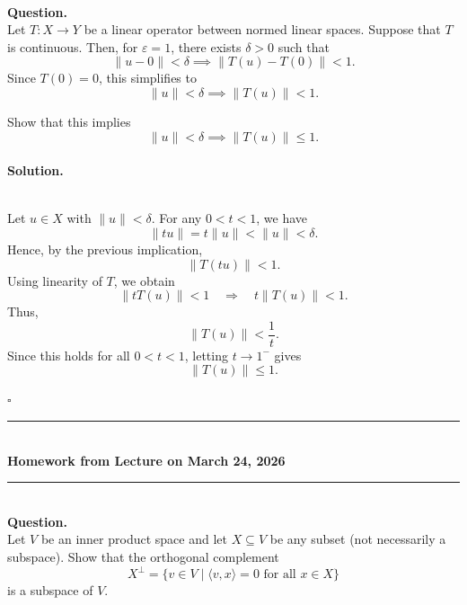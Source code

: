 \documentclass{article}
\begin{document}
\bigskip

\hfill \break  $~\!\!$ \dotfill \medskip \\
\textbf{Question.}\\
Let $T: X \to Y$ be a linear operator between normed linear spaces. Suppose that $T$ is continuous. Then, for $\varepsilon = 1$, there exists $\delta > 0$ such that
\[
\|u - 0\| < \delta \implies \|T(u) - T(0)\| < 1.
\]
Since $T(0) = 0$, this simplifies to
\[
\|u\| < \delta \implies \|T(u)\| < 1.
\]

Show that this implies
\[
\|u\| < \delta \implies \|T(u)\| \le 1.
\]
\noindent\\
\textbf{Solution.}\\
\quad\\
\begin{mdframed}[linewidth=1pt]
Let $u \in X$ with $\|u\| < \delta$. For any $0 < t < 1$, we have
\[
\|t u\| = t \|u\| < \|u\| < \delta.
\]
Hence, by the previous implication,
\[
\|T(tu)\| < 1.
\]
Using linearity of $T$, we obtain
\[
\|t T(u)\| < 1 \quad \Rightarrow \quad t \|T(u)\| < 1.
\]
Thus,
\[
\|T(u)\| < \frac{1}{t}.
\]
Since this holds for all $0 < t < 1$, letting $t \to 1^{-}$ gives
\[
\|T(u)\| \le 1.
\]

\hfill $\square$

\end{mdframed}

\bigskip
\begin{center}
\rule{0.5\textwidth}{1pt}\\[6pt]
\textbf{Homework from Lecture on March 24, 2026}\\[2pt]
\rule{0.5\textwidth}{1pt}
\end{center}
\bigskip

\hfill \break  $~\!\!$ \dotfill \medskip \\
\textbf{Question.}\\
Let $V$ be an inner product space and let $X \subseteq V$ be any subset (not necessarily a subspace). Show that the orthogonal complement
\[
X^\perp = \{ v \in V \mid \langle v, x \rangle = 0 \text{ for all } x \in X \}
\]
is a subspace of $V$.
\end{document}
